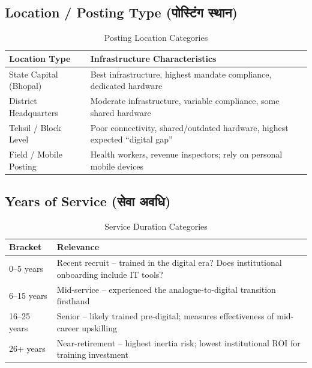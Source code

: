 \documentclass[12pt,a4paper]{article}
\newcommand{\hindi}[1]{{\hindifont #1}}
\begin{document}
\subsection{Location / Posting Type (\hindi{पोस्टिंग स्थान})}

\begin{table}[H]
\centering
\caption{Posting Location Categories}
\label{tab:demo_location}
\begin{tabularx}{\textwidth}{@{}lX@{}}
\toprule
\textbf{Location Type} & \textbf{Infrastructure Characteristics} \\
\midrule
State Capital (Bhopal) & Best infrastructure, highest mandate compliance, dedicated hardware \\
District Headquarters & Moderate infrastructure, variable compliance, some shared hardware \\
Tehsil / Block Level & Poor connectivity, shared/outdated hardware, highest expected ``digital gap'' \\
Field / Mobile Posting & Health workers, revenue inspectors; rely on personal mobile devices \\
\bottomrule
\end{tabularx}
\end{table}

\subsection{Years of Service (\hindi{सेवा अवधि})}

\begin{table}[H]
\centering
\caption{Service Duration Categories}
\label{tab:demo_service}
\begin{tabularx}{\textwidth}{@{}lX@{}}
\toprule
\textbf{Bracket} & \textbf{Relevance} \\
\midrule
0--5 years & Recent recruit -- trained in the digital era? Does institutional onboarding include IT tools? \\
6--15 years & Mid-service -- experienced the analogue-to-digital transition firsthand \\
16--25 years & Senior -- likely trained pre-digital; measures effectiveness of mid-career upskilling \\
26+ years & Near-retirement -- highest inertia risk; lowest institutional ROI for training investment \\
\bottomrule
\end{tabularx}
\end{table}

\end{document}
